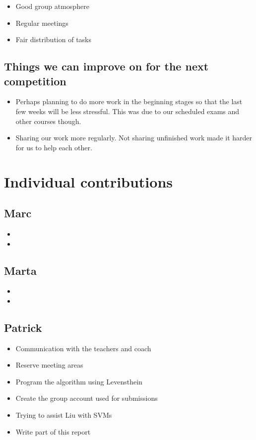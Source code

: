 \documentclass{article}
\begin{document}
\begin{itemize}
\item Good group atmosphere
\item Regular meetings
\item Fair distribution of tasks
\end{itemize}

\subsection{Things we can improve on for the next competition}

\begin{itemize}
\item Perhaps planning to do more work in the beginning stages so that the last few weeks will be less stressful. This was due to our scheduled exams and other courses though.
\item Sharing our work more regularly. Not sharing unfinished work made it harder for us to help each other.
\end{itemize}

\section{Individual contributions}

\subsection{Marc}

\begin{itemize}
\item
\item
\end{itemize}

\subsection{Marta}

\begin{itemize}
\item
\item
\end{itemize}

\subsection{Patrick}

\begin{itemize}
\item Communication with the teachers and coach
\item Reserve meeting areas
\item Program the algorithm using Levensthein
\item Create the group account used for submissions
\item Trying to assist Liu with SVMs
\item Write part of this report
\end{itemize}
\end{document}
